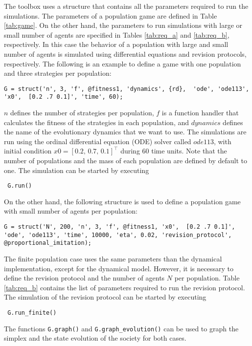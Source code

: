 The toolbox uses a structure that contains all the parameters required to run the simulations. The parameters of a population game are defined in Table \ref{tab:game}. On the other hand, the parameters to run simulations with large or small number of agents are specified in Tables \ref{tab:req_a} and \ref{tab:req_b}, respectively.  In this case the behavior of a population with large and small number of agents is simulated using differential equations and revision protocols, respectively. The following is an example to define a game with one population and three strategies per population:
%
\begin{lstlisting}
G = struct('n', 3, 'f', @fitness1, 'dynamics', {rd},  'ode', 'ode113', 'x0',  [0.2 .7 0.1]', 'time', 60);
\end{lstlisting}
%
$n$ defines the number of strategies per population, $f$ is a function handler that calculates the fitness of the strategies in each population, and $dynamics$ defines the name of the evolutionary dynamics that we want to use. The simulations are run using the ordinal differential equation (ODE) solver called $ode113$, with initial condition $x0 = [0.2, \, 0.7, \, 0.1 ]^\top$ during $60$ time units.
Note that the number of populations and the mass of each population are defined by default to one.  The simulation can be started by executing
%
\begin{lstlisting}
 G.run()
\end{lstlisting}




On the other hand, the following structure is used to define a population game with small number of agents per population:
%
\begin{lstlisting}
G = struct('N', 200, 'n', 3, 'f', @fitness1, 'x0',  [0.2 .7 0.1]', 'ode', 'ode113', 'time', 10000, 'eta', 0.02, 'revision_protocol', @proportional_imitation); 
\end{lstlisting}
%
The finite population case uses the same parameters than the dynamical implementation, except for the dynamical model. However, it is necessary to define the revision protocol  and the number of agents $N$ per population.
Table \ref{tab:req_b} contains the list of parameters required to run the revision protocol. The simulation of the revision protocol can be started by executing
\begin{lstlisting}
 G.run_finite()
\end{lstlisting}

The functions \verb|G.graph()| and \verb|G.graph_evolution()| can be used to graph the simplex and the state evolution of the society for both cases.



